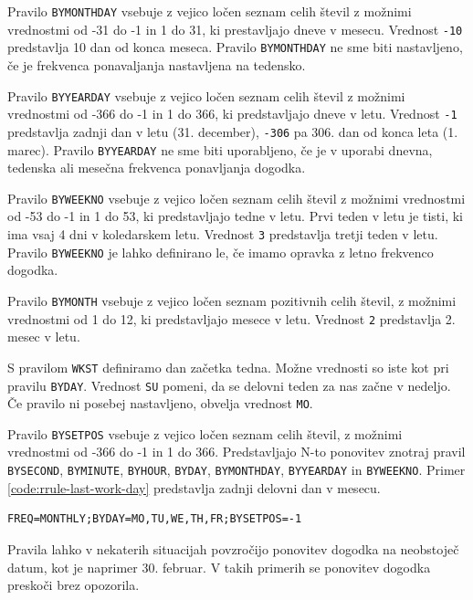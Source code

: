 Pravilo \texttt{BYMONTHDAY} vsebuje z vejico ločen seznam celih števil z možnimi vrednostmi od -31 do -1 in 1 do 31, ki prestavljajo dneve v mesecu. Vrednost \texttt{-10} predstavlja 10 dan od konca meseca. Pravilo \texttt{BYMONTHDAY} ne sme biti nastavljeno, če je frekvenca ponavaljanja nastavljena na tedensko.

Pravilo \texttt{BYYEARDAY} vsebuje z vejico ločen seznam celih števil z možnimi vrednostmi od -366 do -1 in 1 do 366, ki predstavljajo dneve v letu. Vrednost \texttt{-1} predstavlja zadnji dan v letu (31. december), \texttt{-306} pa 306. dan od konca leta (1. marec). Pravilo \texttt{BYYEARDAY} ne sme biti uporabljeno, če je v uporabi dnevna, tedenska ali mesečna frekvenca ponavljanja dogodka.

Pravilo \texttt{BYWEEKNO} vsebuje z vejico ločen seznam celih števil z možnimi vrednostmi od -53 do -1 in 1 do 53, ki predstavljajo tedne v letu. Prvi teden v letu je tisti, ki ima vsaj 4 dni v koledarskem letu. Vrednost \texttt{3} predstavlja tretji teden v letu. Pravilo \texttt{BYWEEKNO} je lahko definirano le, če imamo opravka z letno frekvenco dogodka.

Pravilo \texttt{BYMONTH} vsebuje z vejico ločen seznam pozitivnih celih števil, z možnimi vrednostmi od 1 do 12, ki predstavljajo mesece v letu. Vrednost \texttt{2} predstavlja 2. mesec v letu.

S pravilom \texttt{WKST} definiramo dan začetka tedna. Možne vrednosti so iste kot pri pravilu \texttt{BYDAY}. Vrednost \texttt{SU} pomeni, da se delovni teden za nas začne v nedeljo. Če pravilo ni posebej nastavljeno, obvelja vrednost \texttt{MO}.

Pravilo \texttt{BYSETPOS} vsebuje z vejico ločen seznam celih števil, z možnimi vrednostmi od -366 do -1 in 1 do 366. Predstavljajo N-to ponovitev znotraj pravil \texttt{BYSECOND}, \texttt{BYMINUTE}, \texttt{BYHOUR}, \texttt{BYDAY}, \texttt{BYMONTHDAY}, \texttt{BYYEARDAY} in \texttt{BYWEEKNO}. Primer \ref{code:rrule-last-work-day} predstavlja zadnji delovni dan v mesecu.

\begin{lstlisting}[caption=Primer uporabe pravila za zadnji delovni dan v mesecu., label=code:rrule-last-work-day]
FREQ=MONTHLY;BYDAY=MO,TU,WE,TH,FR;BYSETPOS=-1
\end{lstlisting}

Pravila lahko v nekaterih situacijah povzročijo ponovitev dogodka na neobstoječ datum, kot je naprimer 30. februar. V takih primerih se ponovitev dogodka preskoči brez opozorila.

